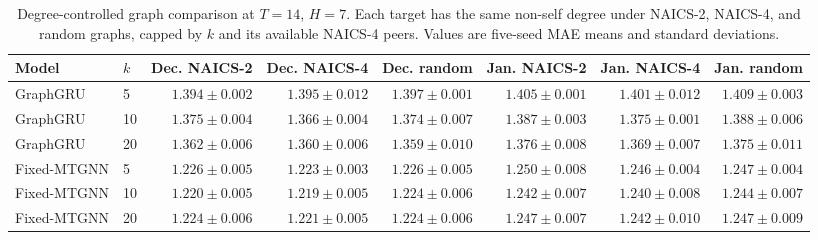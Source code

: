 \begin{table}[!htbp]
\centering
\begingroup
\singlespacing
\fontsize{9pt}{10.5pt}\selectfont
\setlength{\tabcolsep}{4pt}
\renewcommand{\arraystretch}{1.08}
\caption{Degree-controlled graph comparison at $T=14$, $H=7$. Each target has the same non-self degree under NAICS-2, NAICS-4, and random graphs, capped by $k$ and its available NAICS-4 peers. Values are five-seed MAE means and standard deviations.}
\label{tab:semantic_granularity_transfer}
\begin{adjustbox}{max width=\linewidth}
\begin{tabular}{llrrrrrr}
\toprule
Model & $k$ & Dec. NAICS-2 & Dec. NAICS-4 & Dec. random & Jan. NAICS-2 & Jan. NAICS-4 & Jan. random \\
\midrule
GraphGRU & 5 & $1.394\pm 0.002$ & $1.395\pm 0.012$ & $1.397\pm 0.001$ & $1.405\pm 0.001$ & $1.401\pm 0.012$ & $1.409\pm 0.003$ \\
GraphGRU & 10 & $1.375\pm 0.004$ & $1.366\pm 0.004$ & $1.374\pm 0.007$ & $1.387\pm 0.003$ & $1.375\pm 0.001$ & $1.388\pm 0.006$ \\
GraphGRU & 20 & $1.362\pm 0.006$ & $1.360\pm 0.006$ & $1.359\pm 0.010$ & $1.376\pm 0.008$ & $1.369\pm 0.007$ & $1.375\pm 0.011$ \\
\addlinespace[3pt]
Fixed-MTGNN & 5 & $1.226\pm 0.005$ & $1.223\pm 0.003$ & $1.226\pm 0.005$ & $1.250\pm 0.008$ & $1.246\pm 0.004$ & $1.247\pm 0.004$ \\
Fixed-MTGNN & 10 & $1.220\pm 0.005$ & $1.219\pm 0.005$ & $1.224\pm 0.006$ & $1.242\pm 0.007$ & $1.240\pm 0.008$ & $1.244\pm 0.007$ \\
Fixed-MTGNN & 20 & $1.224\pm 0.006$ & $1.221\pm 0.005$ & $1.224\pm 0.006$ & $1.247\pm 0.007$ & $1.242\pm 0.010$ & $1.247\pm 0.009$ \\
\bottomrule
\end{tabular}
\end{adjustbox}
\endgroup
\end{table}
